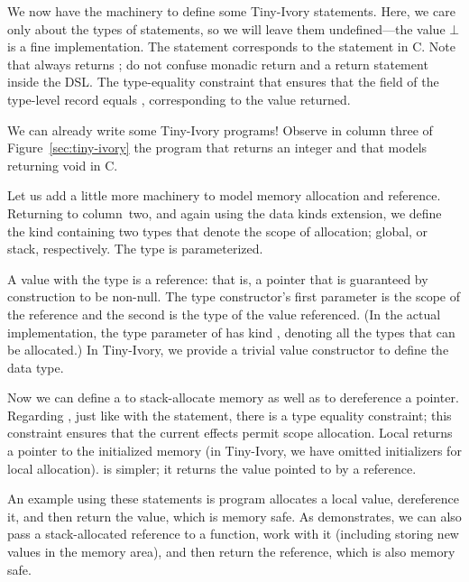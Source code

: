 We now have the machinery to define some Tiny-Ivory statements.  Here, we care
only about the types of statements, so we will leave them undefined---the value
$\bot$ is a fine implementation.  The statement  corresponds to the
 statement in C.  Note that  always returns \cd{()}; do not
confuse monadic return and a return statement inside the DSL.  The type-equality
constraint that ensures that the  field of the type-level record equals
, corresponding to the value returned.

We can already write some Tiny-Ivory programs!  Observe in column three of
Figure~\ref{sec:tiny-ivory} the program  that returns an integer and
 that models returning void in C.

Let us add a little more machinery to model memory allocation and reference.
Returning to column~two, and again using the data kinds extension, we define the
kind  containing two types that denote the scope of allocation;
global, or stack, respectively.  The  type is parameterized.

A value with the type  is a reference: that is, a pointer that is
guaranteed by construction to be non-null.  The type constructor's first
parameter is the scope of the reference and the second is the type of the value
referenced.  (In the actual implementation, the type parameter of  has
kind , denoting all the types that can be allocated.)  In Tiny-Ivory,
we provide a trivial value constructor to define the data type.

Now we can define a  to stack-allocate memory as well as  to
dereference a pointer.  Regarding , just like with the 
statement, there is a type equality constraint; this constraint ensures that the
current effects permit scope allocation.  Local returns a pointer to the
initialized memory (in Tiny-Ivory, we have omitted initializers for local
allocation).   is simpler; it returns the value pointed to by a
reference.

An example using these statements is program  allocates a local value,
dereference it, and then return the value, which is memory safe.  As 
demonstrates, we can also pass a stack-allocated reference to a function, work
with it (including storing new values in the memory area), and then return the
reference, which is also memory safe.


